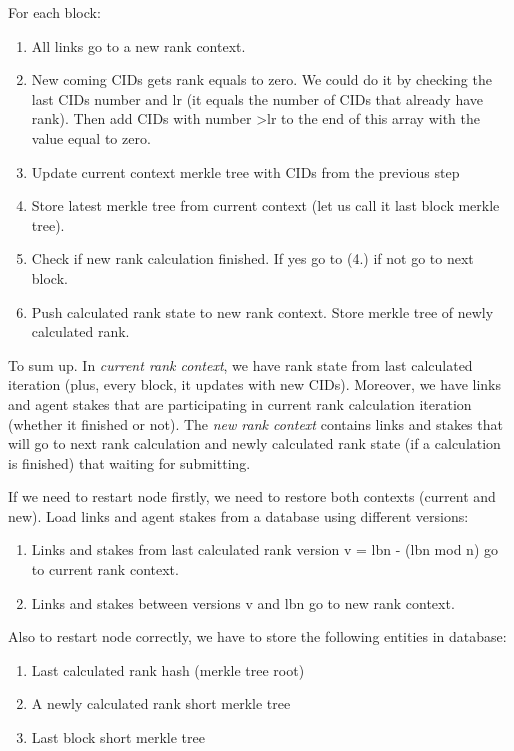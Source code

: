 \documentclass[8pt,oneside]{amsart}
\newcommand{\code}[1]{{\PlayBold #1}}
\begin{document}
For each block:

\begin{enumerate}
  \item All links go to a new rank context.
  \item New coming CIDs gets rank equals to zero. We could do it by checking the last CIDs number and \code{lr} (it equals the number of CIDs that already have rank). Then add CIDs with number \code{>lr} to the end of this array with the value equal to zero.
  \item Update current context merkle tree with CIDs from the previous step
  \item Store latest merkle tree from current context (let us call it last block merkle tree).
  \item Check if new rank calculation finished. If yes go to (4.) if not go to next block.
  \item Push calculated rank state to new rank context. Store merkle tree of newly calculated rank.
\end{enumerate}
To sum up. In \textit{current rank context}, we have rank state from last calculated iteration (plus, every block, it updates with new CIDs). Moreover, we have links and agent stakes that are participating in current rank calculation iteration (whether it finished or not). The \textit{new rank context} contains links and stakes that will go to next rank calculation and newly calculated rank state (if a calculation is finished) that waiting for submitting.

If we need to restart node firstly, we need to restore both contexts (current and new).
Load links and agent stakes from a database using different versions:

\begin{enumerate}
  \item Links and stakes from last calculated rank version \code{v = lbn - (lbn mod n)} go to current rank context.
  \item Links and stakes between versions \code{v} and \code{lbn} go to new rank context.
\end{enumerate}

Also to restart node correctly, we have to store the following entities in database:

\begin{enumerate}
  \item Last calculated rank hash (merkle tree root)
  \item A newly calculated rank short merkle tree
  \item Last block short merkle tree
\end{enumerate}
\end{document}
